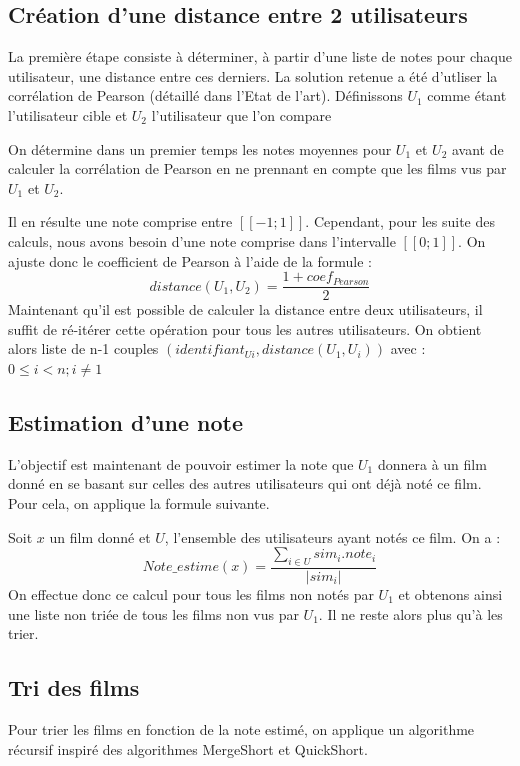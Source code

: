 \documentclass{report}
\begin{document}
\subsection{Création d'une distance entre 2 utilisateurs}
La première étape consiste à déterminer, à partir d'une liste de notes pour chaque utilisateur, une distance entre ces derniers. La solution retenue a été d'utliser la corrélation de Pearson (détaillé dans l'Etat de l'art). Définissons $U_{1}$ comme étant l'utilisateur cible et $U_{2}$ l'utilisateur que l'on compare\par
On détermine dans un premier temps les notes moyennes pour $U_{1}$ et $U_{2}$ avant de calculer la corrélation de Pearson en ne prennant en compte que les films vus par $U_{1}$ et $U_{2}$.\par
Il en résulte une note comprise entre $[\![-1;1]\!]$. Cependant, pour les suite des calculs, nous avons besoin d'une note comprise dans l'intervalle $[\![0;1]\!]$. On ajuste donc le coefficient de Pearson à l'aide de la formule :
$$distance(U_1, U_2) = \frac{1 + coef_{Pearson}}{2}$$
Maintenant qu'il est possible de calculer la distance entre deux utilisateurs, il suffit de ré-itérer cette opération pour tous les autres utilisateurs. On obtient alors liste de n-1 couples ${(identifiant_{Ui}, distance(U_1, U_i))}$ avec : $0 \leqslant i < n  ;  i\neq1$
\subsection{Estimation d'une note}
L'objectif est maintenant de pouvoir estimer la note que $U_1$ donnera à un film donné en se basant sur celles des autres utilisateurs qui ont déjà noté ce film. Pour cela, on applique la formule suivante.\par
Soit $x$ un film donné et $U$, l'ensemble des utilisateurs ayant notés ce film. On a :
$$Note\_estime(x) = \frac{\sum_{i\in{U}} sim_i.note_i}{|sim_i|}$$
On effectue donc ce calcul pour tous les films non notés par $U_{1}$ et obtenons ainsi une liste non triée de tous les films non vus par $U_{1}$. Il ne reste alors plus qu'à les trier.

\subsection{Tri des films}
Pour trier les films en fonction de la note estimé, on applique un algorithme récursif inspiré des algorithmes MergeShort et QuickShort.









\end{document}
